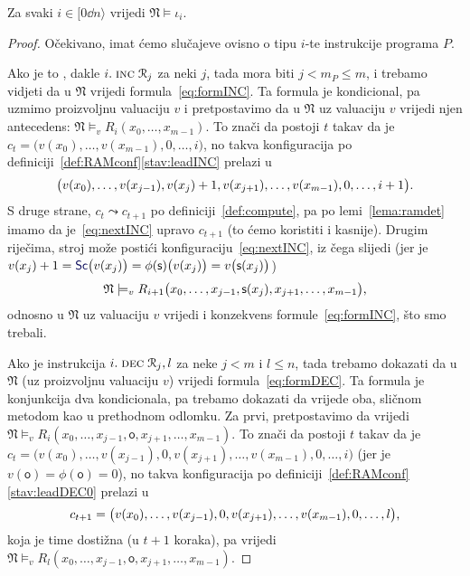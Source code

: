 \begin{lema}[{name=[istinitost instrukcijskih formula u $\mathfrak N$]}]\label{lm:Niotai}
Za svaki $i\in[0\dd n\rangle$ vrijedi $\mathfrak N\models\iota_i$.
\end{lema}
\begin{proof}
Očekivano, imat ćemo slučajeve ovisno o tipu $i$-te instrukcije programa $P$.

Ako je to \inc, dakle $i.\;\textsc{inc}\;\mathcal R_{j}$ za neki $j$, tada mora biti $j<m_P\le m$, i trebamo vidjeti da u $\mathfrak N$ vrijedi formula~\eqref{eq:formINC}. Ta formula je kondicional, pa uzmimo proizvoljnu valuaciju $v$ i pretpostavimo da u $\mathfrak N$ uz valuaciju $v$ vrijedi njen antecedens: $\mathfrak N\models_v R_i(x_0,\dotsc,x_{m-1})$. To znači da postoji $t$ takav da je $c_t=\bigl(v(x_0),\dotsc,v(x_{m-1}),0,\dotsc,i\bigr)$, no takva konfiguracija po definiciji~\ref{def:RAMconf}\eqref{stav:leadINC} prelazi u
\begin{equation}\label{eq:nextINC}
	\bigl(v(x_0),\dotsc,v(x_{j-1}),v(x_j)+1,v(x_{j+1}),\dotsc,v(x_{m-1}),0,\dotsc,i+1\bigr)\text.
\end{equation}
S druge strane, $c_t\leadsto c_{t+1}$ po definiciji~\ref{def:compute}, pa po lemi~\ref{lema:ramdet} imamo da je~\eqref{eq:nextINC} upravo $c_{t+1}$ (to ćemo koristiti i kasnije). Drugim riječima, stroj može postići konfiguraciju~\eqref{eq:nextINC}, iz čega slijedi (jer je $v(x_j)+1=\f{Sc}\bigl(v(x_j)\bigr)=\phi(\mathsf s)\bigl(v(x_j)\bigr)=v\bigl(\mathsf s(x_j)\bigr)$)
\begin{equation}
    \mathfrak N\models_v R_{i+1}\bigl(x_0,\dotsc,x_{j-1},\mathsf s(x_j),x_{j+1},\dotsc,x_{m-1}\bigr)\text,
\end{equation}
odnosno u $\mathfrak N$ uz valuaciju $v$ vrijedi i konzekvens formule~\eqref{eq:formINC}, što smo trebali.

Ako je instrukcija $i.\;\textsc{dec}\;\mathcal R_{j},l$ za neke $j<m$ i $l\le n$, tada trebamo dokazati da u $\mathfrak N$ (uz proizvoljnu valuaciju $v$) vrijedi formula~\eqref{eq:formDEC}. Ta formula je konjunkcija dva kondicionala, pa trebamo dokazati da vrijede oba, sličnom metodom kao u prethodnom odlomku. Za prvi, pretpostavimo da vrijedi $\mathfrak N\models_v R_i(x_0,\dotsc,x_{j-1},\mathsf o,x_{j+1},\dotsc,x_{m-1})$. To znači da postoji $t$ takav da je $c_t=\bigl(v(x_0),\dotsc,v(x_{j-1}),0,v(x_{j+1}),\dotsc,v(x_{m-1}),0,\dotsc,i\bigr)$ (jer je $v(\mathsf o)=\phi(\mathsf o)=0$), no takva konfiguracija po definiciji~\ref{def:RAMconf}\eqref{stav:leadDEC0} prelazi u
\begin{equation}
    c_{t+1}=\bigl(v(x_0),\dotsc,v(x_{j-1}),0,v(x_{j+1}),\dotsc,v(x_{m-1}),0,\dotsc,l\bigr)\text,
\end{equation}
koja je time dostižna (u $t+1$ koraka), pa vrijedi $\mathfrak N\models_v R_l(x_0,\dotsc,x_{j-1},\mathsf o,x_{j+1},\dotsc,x_{m-1})$.


\end{proof}
